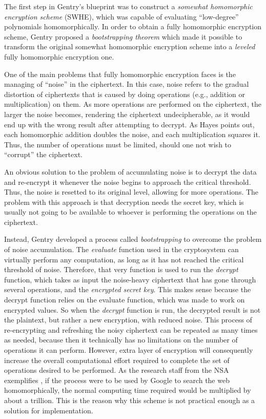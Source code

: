 The first step in Gentry's blueprint was to construct a \emph{somewhat homomorphic encryption scheme} (SWHE), which was capable of evaluating ``low-degree'' polynomials homomorphically. In order to obtain a fully homomorphic encryption scheme, Gentry proposed a \emph{bootstrapping theorem} which made it possible to transform the original somewhat homomorphic encryption scheme into a \emph{leveled} fully homomorphic encryption one.

One of the main problems that fully homomorphic encryption faces is the managing of ``noise'' in the ciphertext. In this case, noise refers to the gradual distortion of ciphertexts that is caused by doing operations (e.g., addition or multiplication) on them. As more operations are performed on the ciphertext, the larger the noise becomes, rendering the ciphertext undecipherable, as it would end up with the wrong result after attempting to decrypt. As Hayes \cite{Hayes2012} points out, each homomorphic addition doubles the noise, and each multiplication squares it. Thus, the number of operations must be limited, should one not wish to ``corrupt'' the ciphertext. 

An obvious solution to the problem of accumulating noise is to decrypt the data and re-encrypt it whenever the noise begins to approach the critical threshold. Thus, the noise is resetted to its original level, allowing for more operations. The problem with this approach is that decryption needs the secret key, which is usually not going to be available to whoever is performing the operations on the ciphertext. 

Instead, Gentry developed a process called \emph{bootstrapping} to overcome the problem of noise accumulation. The \emph{evaluate} function used in the cryptosystem can virtually perform any computation, as long as it has not reached the critical threshold of noise. Therefore, that very function is used to run the \emph{decrypt} function, which takes as input the noise-heavy ciphertext that has gone through several operations, and the \emph{encrypted secret key}. This makes sense because the decrypt function relies on the evaluate function, which was made to work on encrypted values. So when the \emph{decrypt} function is run, the decrypted result is not the plaintext, but rather a new encryption, with reduced noise. This process of re-encrypting and refreshing the noisy ciphertext can be repeated as many times as needed, because then it technically has no limitations on the number of operations it can perform. However, extra layer of encryption will consequently increase the overall computational effort required to complete the set of operations desired to be performed. As the research staff from the NSA exemplifies \cite{NSA2014}, if the process were to be used by Google to search the web homomorphically, the normal computing time required would be multiplied by about a trillion. This is the reason why this scheme is not practical enough as a solution for implementation.

